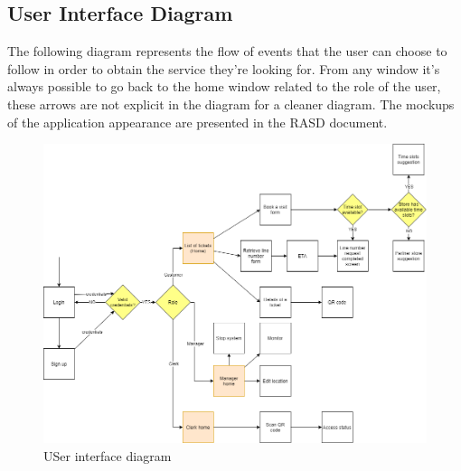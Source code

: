 \subsection{User Interface Diagram}
The following diagram represents the flow of events that the user can choose to follow in order to obtain the service they're looking for.
From any window it's always possible to go back to the home window related to the role of the user, these arrows are not explicit in the diagram for a cleaner diagram.
The mockups of the application appearance are presented in the RASD document.

\begin{figure}[H]
    \centering
    \includegraphics[height=0.4\textwidth]{Images/UXDiagram.png}
    \caption{USer interface diagram}
\end{figure}
